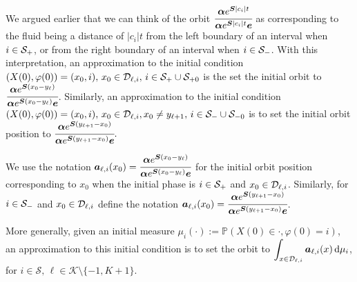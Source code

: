 We argued earlier that we can think of the orbit \(\cfrac{\boldsymbol \alpha e^{\boldsymbol{S}|c_i|t}}{\boldsymbol \alpha e^{\boldsymbol{S}|c_i|t}\boldsymbol e}\) as corresponding to the fluid being a distance of \(|c_i|t\) from the left boundary of an interval when \(i\in\mathcal{S}_+\), or from the right boundary of an interval when \(i\in\mathcal{S}_-\). With this interpretation, an approximation to the initial condition \((X(0),\varphi(0))=(x_0,i),\,x_0\in\mathcal D_{\ell,i},\,i\in\mathcal S_+\cup\mathcal{S}_{+0}\) is the set the initial orbit to \(\cfrac{\boldsymbol \alpha e^{\boldsymbol{S}(x_0-y_\ell)}}{\boldsymbol \alpha e^{\boldsymbol{S}(x_0-y_\ell)}\boldsymbol e}\). Similarly, an approximation to the initial condition \((X(0),\varphi(0))=(x_0,i), \,x_0\in\mathcal D_{\ell,i}, x_0\neq y_{\ell+1},\,i\in\mathcal S_-\cup\mathcal{S}_{-0}\) is to set the initial orbit position to \(\cfrac{\boldsymbol \alpha e^{\boldsymbol{S}(y_{\ell+1}-x_0)}}{\boldsymbol \alpha e^{\boldsymbol{S}(y_{\ell+1}-x_0)}\boldsymbol e}.\) 

We use the notation \(\boldsymbol a_{\ell,i}(x_0) = \cfrac{\boldsymbol \alpha e^{\boldsymbol{S}(x_0-y_\ell)}}{\boldsymbol \alpha e^{\boldsymbol{S}(x_0-y_\ell)}\boldsymbol e}\) for the initial orbit position corresponding to \(x_0\) when the initial phase is \(i\in\mathcal{S}_+\) and \(x_0\in\mathcal{D}_{\ell,i}\). Similarly, for \(i\in\mathcal{S}_-\) and \(x_0\in\mathcal{D}_{\ell,i}\) define the notation \(\boldsymbol a_{\ell,i}(x_0) = \cfrac{\boldsymbol \alpha e^{\boldsymbol{S}(y_{\ell+1} - x_0)}}{\boldsymbol \alpha e^{\boldsymbol{S}(y_{\ell+1}-x_0)}\boldsymbol e}\). 

More generally, given an initial measure \(\mu_i(\cdot):= \mathbb P(X(0)\in\cdot,\varphi(0)=i)\), an approximation to this initial condition is to set the orbit to \(\displaystyle\int_{x\in\mathcal{D}_{\ell,i}}\boldsymbol a_{\ell,i} (x) \, \mathrm{d} \mu_i\), for \(i\in\mathcal S,\, \ell\in\mathcal K\setminus\{-1,K+1\}\). 

